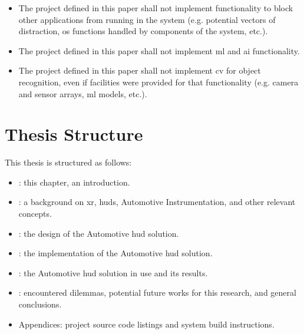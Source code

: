         \begin{itemize}
            \item The project defined in this paper shall not implement functionality to block other applications from running in the system (e.g. potential vectors of distraction, \gls{os} functions handled by components of the system, etc.).
            \item The project defined in this paper shall not implement \gls{ml} and \gls{ai} functionality.
            \item The project defined in this paper shall not implement \gls{cv} for object recognition, even if facilities were provided for that functionality (e.g. camera and sensor arrays, \gls{ml} models, etc.).
        \end{itemize}

\section{Thesis Structure}
    \par This thesis is structured as follows:

    \begin{itemize}
        \item {}: this chapter, an introduction.
        \item {}: a background on \gls{xr}, \glspl{hud}, Automotive Instrumentation, and other relevant concepts.
        \item {}: the design of the Automotive \gls{hud} solution.
        \item {}: the implementation of the Automotive \gls{hud} solution.
        \item {}: the Automotive \gls{hud} solution in use and its results.
        \item {}: encountered dilemmas, potential future works for this research, and general conclusions.
        \item Appendices: project source code listings and system build instructions.
    \end{itemize}

